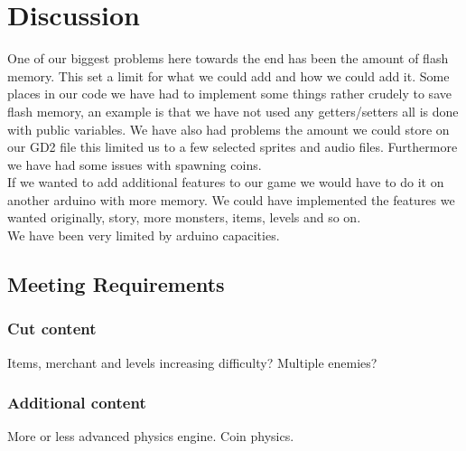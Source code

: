 \chapter{Discussion}
 
One of our biggest problems here towards the end has been the amount of flash memory. This set a limit for what we could add and how we could add it. Some places in our code we have had to implement some things rather crudely to save flash memory, an example is that we have not used any getters/setters all is done with public variables. We have also had problems the amount we could store on our GD2 file this limited us to a few selected sprites and audio files. Furthermore we have had some issues with spawning coins.\\
If we wanted to add additional features to our game we would have to do it on another arduino with more memory. We could have implemented the features we wanted originally, story, more monsters, items, levels and so on.\\
We have been very limited by arduino capacities. 


\section{Meeting Requirements}
\subsection{Cut content}
Items, merchant and levels
increasing difficulty?
Multiple enemies?
\subsection{Additional content}
More or less advanced physics engine.
Coin physics.